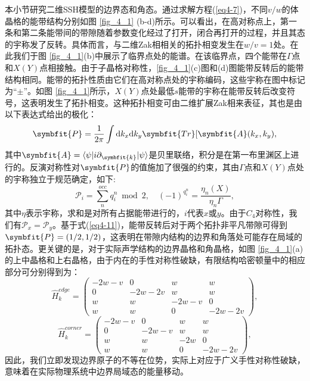 本小节研究二维SSH模型的边界态和角态。通过求解方程(\ref{eq4-7})，不同\(v/w\)的体晶格的能带结构分别如图 \ref{fig_4_1} (b-d)所示。可以看出，在高对称点上，第一条和第二条能带间的带隙随着参数变化经过了打开，闭合再打开的过程，并且其态的宇称发了反转。具体而言，与二维Zak相相关的拓扑相变发生在\(w/v=1\)处。在此我们于图 \ref{fig_4_1}(b)中展示了临界点处的能谱。在该临界点，四个能带在\(\Gamma\)点和\(X (Y)\)点相接触。由于子晶格对称性，\ref{fig_4_1}(c)图和(d)图能带反转后的能带结构相同。能带的拓扑性质由它们在高对称点处的宇称编码，这些宇称在图中标记为“\(\pm\)”。如图 \ref{fig_4_1}所示，\(X (Y)\)点处最低\(s\)能带的宇称在能带反转后改变符号，这表明发生了拓扑相变。这种拓扑相变可由二维扩展Zak相来表征，其也是由以下表达式给出的极化\cite{C45-1}：
\begin{equation}
    \symbfit{P}=\frac{1}{2\pi}\int \mathrm{d}k_x \mathrm{d}k_y \symbfit{Tr}[\symbfit{A}(k_x,k_y),
    \label{eq4-10}
\end{equation}
其中\(\symbfit{A}=\langle\psi|i\partial_{\symbfit{k}}|\psi\rangle\)是贝里联络，积分是在第一布里渊区上进行的。反演对称性对\(\symbfit{P}\)的值施加了很强的约束，其由\(\Gamma\)点和\(X (Y)\)点处的宇称独立于规范确定，如下\cite{C45-2}:
\begin{equation}
    \mathcal{P}_i = \sum_{n}^{occ} q_i^n \bmod 2, \quad (-1)^{q_i^n} = \frac{\eta_n(X)}{\eta_n\Gamma},
    \label{eq4-11}
\end{equation}
其中\(\eta\)表示宇称，求和是对所有占据能带进行的，\(i\)代表\(x\)或\(y\)。由于\(C_4\)对称性，我们有\(\mathcal{P}_x = \mathcal{P}_y\)。基于式(\ref{eq4-11})，能带反转后对于两个拓扑非平凡带隙可得到\(\symbfit{P}=(1/2,1/2)\)，这表明在带隙内结构的边界和角落处可能存在局域的拓扑态。更关键的是，对于实际声学结构的边界晶格和角晶格，如图 \ref{fig_4_1}(a)的上中晶格和上右晶格，由于内在的手性对称性破缺，有限结构哈密顿量中的相应部分可分别得到为：
\begin{equation}
\hat{H}_k^{edge} = 
\begin{pmatrix}
-2w - v & 0 & w & w \\
0 & -2w - 2v & w & w \\
w & w & -2w - v & 0 \\
w & w & 0 & -2w - 2v
\end{pmatrix},
\label{eq4-12}
\end{equation}
\begin{equation}
\hat{H}_k^{corner} = 
\begin{pmatrix}
-2w - v & 0 & w & w \\
0 & -2w - v & w & w \\
w & w & -2w & 0 \\
w & w & 0 & -2w - 2v
\end{pmatrix},
\label{eq4-13}
\end{equation}
因此，我们立即发现边界原子的不等在位势，实际上对应于广义手性对称性破缺\cite{i5}，意味着在实际物理系统中边界局域态的能量移动。

